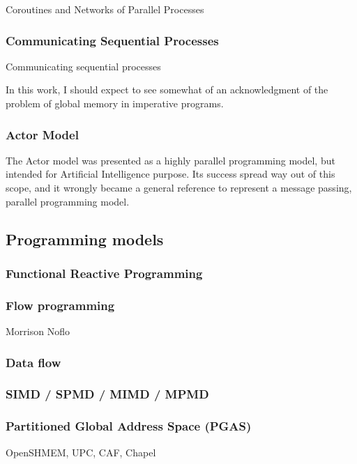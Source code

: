 Coroutines and Networks of Parallel Processes\cite{Kahn1976}

\subsubsection{Communicating Sequential Processes}

Communicating sequential processes \cite{Hoare1978}

In this work, I should expect to see somewhat of an acknowledgment of the problem of global memory in imperative programs.

\subsubsection{Actor Model}

The Actor model was presented as a highly parallel programming model, but intended for Artificial Intelligence purpose.
Its success spread way out of this scope, and it wrongly became a general reference to represent a message passing, parallel programming model.

\subsection{Programming models}

\subsubsection{Functional Reactive Programming}

\subsubsection{Flow programming}
Morrison
Noflo

\subsubsection{Data flow}


\subsubsection{SIMD / SPMD / MIMD / MPMD}

\subsubsection{Partitioned Global Address Space (PGAS)}
OpenSHMEM, UPC, CAF, Chapel


